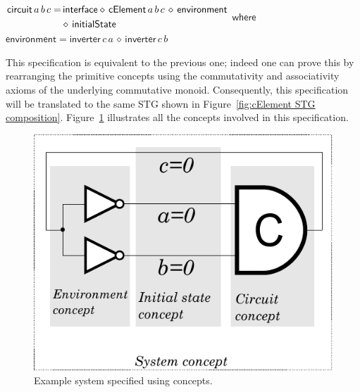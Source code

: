 \documentclass[british,compsoc]{IEEEtran}
\begin{document}


\begin{minipage}[t]{1\columnwidth}%
$\begin{aligned}\mathsf{circuit} \,a \,b \,c=&\mathsf{\,interface}\diamond\mathsf{\,cElement}\,a \,b \,c \,\diamond\,\mathsf{environment}\\
&\diamond\,\mathsf{initialState}
\end{aligned}\\
$
$\mathsf{where}$\\
$\mathsf{environment}=\mathsf{inverter} \,c \,a \,\diamond\,\mathsf{inverter}\,c \,b$
\\
\end{minipage}
This specification is equivalent to the previous one; indeed one can
prove this by rearranging the primitive concepts using the commutativity
and associativity axioms of the underlying commutative monoid. Consequently,
this specification will be translated to the same STG shown in Figure~\ref{fig:cElement STG  composition}.
Figure~\ref{fig:cElement-concepts} illustrates all the concepts
involved in this specification.

\begin{figure}[t]
\begin{centering}
\includegraphics[scale=0.62]{Images/c-element-circuit-redo}
\par\end{centering}

\protect\caption{\label{fig:cElement-concepts}Example system specified using concepts.}
\end{figure}
\end{document}
